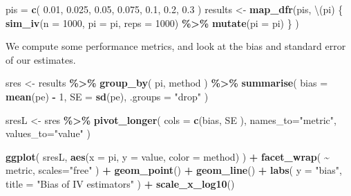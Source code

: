 \documentclass[
]{book}
\newenvironment{Shaded}{\begin{snugshade}}{\end{snugshade}}
\newcommand{\AttributeTok}[1]{\textcolor[rgb]{0.13,0.29,0.53}{#1}}
\newcommand{\DecValTok}[1]{\textcolor[rgb]{0.00,0.00,0.81}{#1}}
\newcommand{\FloatTok}[1]{\textcolor[rgb]{0.00,0.00,0.81}{#1}}
\newcommand{\FunctionTok}[1]{\textcolor[rgb]{0.13,0.29,0.53}{\textbf{#1}}}
\newcommand{\NormalTok}[1]{#1}
\newcommand{\OtherTok}[1]{\textcolor[rgb]{0.56,0.35,0.01}{#1}}
\newcommand{\SpecialCharTok}[1]{\textcolor[rgb]{0.81,0.36,0.00}{\textbf{#1}}}
\newcommand{\StringTok}[1]{\textcolor[rgb]{0.31,0.60,0.02}{#1}}
\begin{document}
\begin{Shaded}
\begin{Highlighting}[]
\NormalTok{pis }\OtherTok{=} \FunctionTok{c}\NormalTok{( }\FloatTok{0.01}\NormalTok{, }\FloatTok{0.025}\NormalTok{, }\FloatTok{0.05}\NormalTok{, }\FloatTok{0.075}\NormalTok{, }\FloatTok{0.1}\NormalTok{, }\FloatTok{0.2}\NormalTok{, }\FloatTok{0.3}\NormalTok{ )}
\NormalTok{results }\OtherTok{\textless{}{-}} \FunctionTok{map\_dfr}\NormalTok{(pis, \textbackslash{}(pi) \{}
  \FunctionTok{sim\_iv}\NormalTok{(}\AttributeTok{n =} \DecValTok{1000}\NormalTok{, }\AttributeTok{pi =}\NormalTok{ pi, }\AttributeTok{reps =} \DecValTok{1000}\NormalTok{) }\SpecialCharTok{\%\textgreater{}\%}
    \FunctionTok{mutate}\NormalTok{(}\AttributeTok{pi =}\NormalTok{ pi)}
\NormalTok{\} )}
\end{Highlighting}
\end{Shaded}

We compute some performance metrics, and look at the bias and standard error of our estimates.

\begin{Shaded}
\begin{Highlighting}[]
\NormalTok{sres }\OtherTok{\textless{}{-}}\NormalTok{ results }\SpecialCharTok{\%\textgreater{}\%}
  \FunctionTok{group\_by}\NormalTok{( pi, method ) }\SpecialCharTok{\%\textgreater{}\%}
  \FunctionTok{summarise}\NormalTok{( }
    \AttributeTok{bias =} \FunctionTok{mean}\NormalTok{(pe) }\SpecialCharTok{{-}} \DecValTok{1}\NormalTok{,}
    \AttributeTok{SE =} \FunctionTok{sd}\NormalTok{(pe), }\AttributeTok{.groups =} \StringTok{"drop"}\NormalTok{ )}

\NormalTok{sresL }\OtherTok{\textless{}{-}}\NormalTok{ sres }\SpecialCharTok{\%\textgreater{}\%}
  \FunctionTok{pivot\_longer}\NormalTok{(}
    \AttributeTok{cols =} \FunctionTok{c}\NormalTok{(bias, SE ),}
    \AttributeTok{names\_to=}\StringTok{"metric"}\NormalTok{,}
    \AttributeTok{values\_to=}\StringTok{"value"}\NormalTok{ )}

\FunctionTok{ggplot}\NormalTok{( sresL, }\FunctionTok{aes}\NormalTok{(}\AttributeTok{x =}\NormalTok{ pi, }\AttributeTok{y =}\NormalTok{ value, }\AttributeTok{color =}\NormalTok{ method) ) }\SpecialCharTok{+}
  \FunctionTok{facet\_wrap}\NormalTok{( }\SpecialCharTok{\textasciitilde{}}\NormalTok{ metric, }\AttributeTok{scales=}\StringTok{"free"}\NormalTok{ ) }\SpecialCharTok{+}
  \FunctionTok{geom\_point}\NormalTok{() }\SpecialCharTok{+} \FunctionTok{geom\_line}\NormalTok{() }\SpecialCharTok{+}
  \FunctionTok{labs}\NormalTok{( }\AttributeTok{y =} \StringTok{"bias"}\NormalTok{, }\AttributeTok{title =} \StringTok{"Bias of IV estimators"}\NormalTok{ ) }\SpecialCharTok{+}
  \FunctionTok{scale\_x\_log10}\NormalTok{()}
\end{Highlighting}
\end{Shaded}
\end{document}

